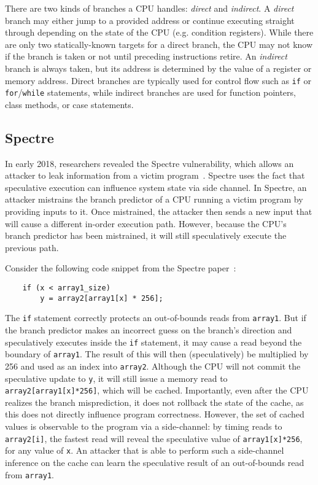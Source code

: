 There are two kinds of branches a CPU handles: \emph{direct} and
\emph{indirect}. A \emph{direct} branch may either jump to a provided address or
continue executing straight through depending on the state of the CPU (e.g. condition
registers). While there are only two statically-known targets for a direct
branch, the CPU may not know if the branch is taken or not until preceding
instructions retire. An \emph{indirect} branch is always taken, but its address
is determined by the value of a register or memory address. Direct branches are
typically used for control flow such as \texttt{if} or
\texttt{for}/\texttt{while} statements, while indirect branches are used for
function pointers, class methods, or case statements.



\subsection{Spectre}

In early 2018, researchers revealed the Spectre vulnerability, which allows an
attacker to leak information from a victim
program~\cite{spectre,project_zero,maisuradze2018speculose}. Spectre uses the
fact that speculative execution can influence system state via side channel. In
Spectre, an attacker mistrains the branch predictor of a CPU running a victim
program by providing inputs to it. Once mistrained, the attacker then sends a
new input that will cause a different in-order execution path. However, because
the CPU's branch predictor has been mistrained, it will still speculatively
execute the previous path.

Consider the following code snippet from the Spectre
paper~\cite{spectre}:

\begin{lstlisting}
    if (x < array1_size)
        y = array2[array1[x] * 256];
\end{lstlisting}

The \texttt{if} statement correctly protects an out-of-bounds reads from \texttt{array1}.
But if the branch predictor makes an incorrect guess on the branch's direction
and speculatively executes inside the \texttt{if} statement, it may
cause a read beyond the boundary of \texttt{array1}. The result of this will
then (speculatively) be multiplied by 256 and used as an index into
\texttt{array2}. Although the CPU will not commit
the speculative update to \texttt{y}, it will still issue a memory read to
\texttt{array2[array1[x]*256]}, which will be cached. Importantly, even after
the CPU realizes the branch misprediction, it does not rollback the
state of the cache, as this does not directly influence program correctness.
However, the set of cached values is observable to the program via a
side-channel: by timing reads to \texttt{array2[i]}, the fastest read will
reveal the speculative value of \texttt{array1[x]*256}, for any value of
\texttt{x}. An attacker that is able to perform such a side-channel inference on
the cache can learn the speculative result of an out-of-bounds read from
\texttt{array1}.


